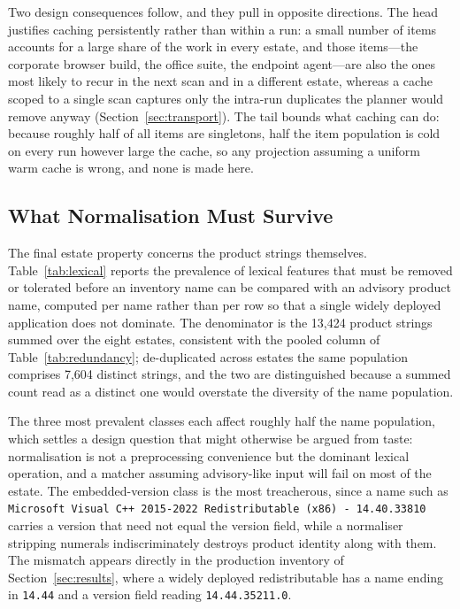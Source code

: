 \documentclass[fleqn,10pt,lineno]{wlpeerj}
\begin{document}
Two design consequences follow, and they pull in opposite directions. The head justifies caching persistently rather than within a run: a small number of items accounts for a large share of the work in every estate, and those items---the corporate browser build, the office suite, the endpoint agent---are also the ones most likely to recur in the next scan and in a different estate, whereas a cache scoped to a single scan captures only the intra-run duplicates the planner would remove anyway (Section~\ref{sec:transport}). The tail bounds what caching can do: because roughly half of all items are singletons, half the item population is cold on every run however large the cache, so any projection assuming a uniform warm cache is wrong, and none is made here.

\subsection{What Normalisation Must Survive}
The final estate property concerns the product strings themselves. Table~\ref{tab:lexical} reports the prevalence of lexical features that must be removed or tolerated before an inventory name can be compared with an advisory product name, computed per name rather than per row so that a single widely deployed application does not dominate. The denominator is the 13,424 product strings summed over the eight estates, consistent with the pooled column of Table~\ref{tab:redundancy}; de-duplicated across estates the same population comprises 7,604 distinct strings, and the two are distinguished because a summed count read as a distinct one would overstate the diversity of the name population.



The three most prevalent classes each affect roughly half the name population, which settles a design question that might otherwise be argued from taste: normalisation is not a preprocessing convenience but the dominant lexical operation, and a matcher assuming advisory-like input will fail on most of the estate. The embedded-version class is the most treacherous, since a name such as \texttt{Microsoft Visual C++ 2015-2022 Redistributable (x86) - 14.40.33810} carries a version that need not equal the version field, while a normaliser stripping numerals indiscriminately destroys product identity along with them. The mismatch appears directly in the production inventory of Section~\ref{sec:results}, where a widely deployed redistributable has a name ending in \texttt{14.44} and a version field reading \texttt{14.44.35211.0}.
\end{document}
